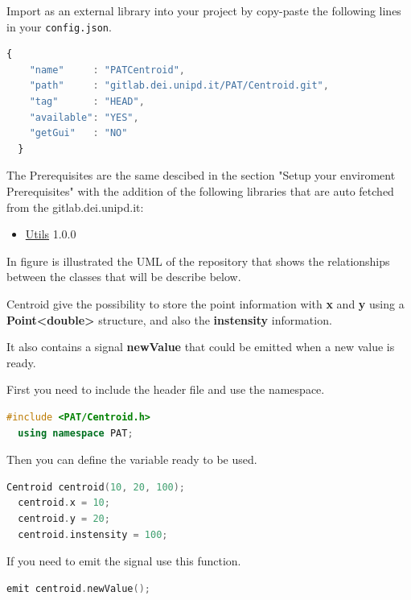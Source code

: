 

Import as an external library into your project by copy-paste the
following lines in your \texttt{config.json}.

\begin{lstlisting}[language=javascript, gobble=2]
  {
    "name"     : "PATCentroid",
    "path"     : "gitlab.dei.unipd.it/PAT/Centroid.git",
    "tag"      : "HEAD",
    "available": "YES",
    "getGui"   : "NO"
  }
\end{lstlisting}


The Prerequisites are the same descibed in the section "Setup your enviroment Prerequisites"  with the addition of the following libraries that are auto fetched from the gitlab.dei.unipd.it:

\begin{itemize}
  \tightlist
  \item
        \href{https://gitlab.dei.unipd.it/PAT/Utils.git}{Utils} 1.0.0
\end{itemize}

In figure  is illustrated the UML of the repository that shows the relationships between the classes that will be describe below.


Centroid give the possibility to store the point information with
\textbf{x} and \textbf{y} using a
\textbf{Point\textless double\textgreater{}} structure, and also the
\textbf{instensity} information.

It also contains a signal \textbf{newValue} that could be emitted
when a new value is ready.

First you need to include the header file and use the namespace.

\begin{lstlisting}[language=c++, gobble=2]
  #include <PAT/Centroid.h>
  using namespace PAT;
\end{lstlisting}

Then you can define the variable ready to be used.

\begin{lstlisting}[language=c++, gobble=2]
  Centroid centroid(10, 20, 100);
  centroid.x = 10;
  centroid.y = 20;
  centroid.instensity = 100;
\end{lstlisting}

If you need to emit the signal use this function.

\begin{lstlisting}[language=c++, gobble=2]
  emit centroid.newValue();
\end{lstlisting}

